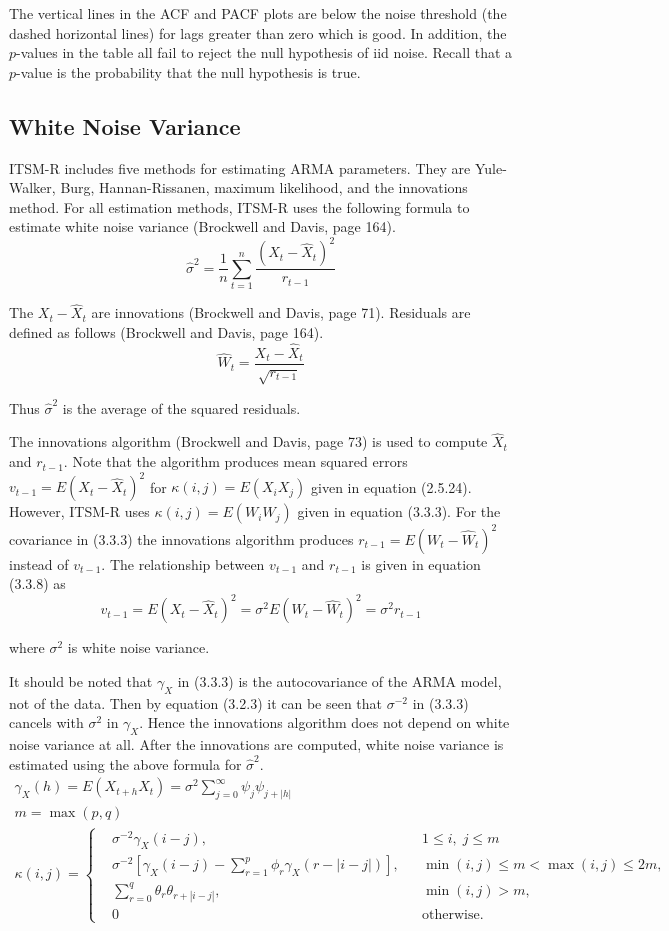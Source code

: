 \documentclass[12pt]{article}
\begin{document}
The vertical lines in the ACF and PACF plots are below the noise threshold
(the dashed horizontal lines)
for lags greater than zero which is good.
In addition, the $p$-values in the table all fail to reject the null hypothesis
of iid noise.
Recall that a $p$-value is the probability that the null hypothesis is true.

\subsection{White Noise Variance}

ITSM-R includes five methods for estimating ARMA parameters.
They are Yule-Walker, Burg, Hannan-Rissanen, maximum likelihood,
and the innovations method.
For all estimation methods, ITSM-R uses
the following formula to estimate white noise variance
(Brockwell and Davis, page 164).
\[
\hat\sigma^2=\frac{1}{n}\sum_{t=1}^n\frac{(X_t-\hat X_t)^2}{r_{t-1}}
\]

The $X_t-\hat X_t$ are innovations (Brockwell and Davis, page 71).
Residuals are defined as follows (Brockwell and Davis, page 164).
\[
\hat W_t=\frac{X_t-\hat X_t}{\sqrt{r_{t-1}}}
\]

Thus $\hat\sigma^2$ is the average of the squared residuals.

\bigskip
The innovations algorithm (Brockwell and Davis, page 73)
is used to compute $\hat X_t$ and $r_{t-1}$.
Note that the algorithm produces mean squared errors
$v_{t-1}=E(X_t-\hat X_t)^2$ for $\kappa(i,j)=E(X_iX_j)$
given in equation (2.5.24).
However, ITSM-R uses $\kappa(i,j)=E(W_iW_j)$ given in
equation (3.3.3).
For the covariance in (3.3.3)
the innovations algorithm produces $r_{t-1}=E(W_t-\hat W_t)^2$
instead of $v_{t-1}$.
The relationship between $v_{t-1}$ and $r_{t-1}$ is given in
equation (3.3.8) as
\[
v_{t-1}=E(X_t-\hat X_t)^2=\sigma^2E(W_t-\hat W_t)^2=\sigma^2r_{t-1}
\]

where $\sigma^2$ is white noise variance.

\bigskip
It should be noted that $\gamma_X$ in (3.3.3) is
the autocovariance of the ARMA model, not of the data.
Then by equation (3.2.3) it can be seen that $\sigma^{-2}$ in (3.3.3)
cancels with $\sigma^2$ in $\gamma_X$.
Hence the innovations algorithm does not depend on white noise variance at all.
After the innovations are computed, white noise variance is estimated
using the above formula for $\hat\sigma^2$.
\begin{gather*}
\gamma_X(h)=E(X_{t+h}X_t)=\sigma^2\sum_{j=0}^\infty\psi_j\psi_{j+|h|}\tag{3.2.3}
\\
m=\max(p,q)\tag{3.3.2}
\\
\kappa(i,j)=\left\{
\begin{aligned}
&\sigma^{-2}\gamma_X(i-j), && 1\le i,\;j\le m\\
&\sigma^{-2}\left[
\gamma_X(i-j)-\sum_{r=1}^p\phi_r\gamma_X(r-|i-j|)\right],
&& \min(i,j)\le m<\max(i,j)\le2m,\\
&\sum_{r=0}^q\theta_r\theta_{r+|i-j|},&&\min(i,j)>m,\\
&0&&\text{otherwise.}
\end{aligned}
\right.\tag{3.3.3}
\end{gather*}
\end{document}
